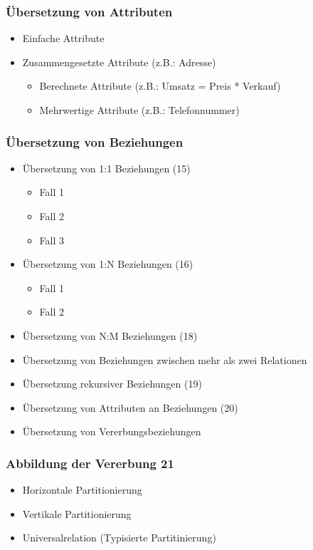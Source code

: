 \subsubsection{Übersetzung von Attributen}
\begin{itemize}
	\item Einfache Attribute
	\item Zusammengesetzte Attribute (z.B.: Adresse)
	\begin{itemize}
		\item Berechnete Attribute (z.B.: Umsatz = Preis * Verkauf)
		\item Mehrwertige Attribute (z.B.: Telefonnummer)
	\end{itemize}
\end{itemize}
\subsubsection{Übersetzung von Beziehungen}
\begin{itemize}
	\item Übersetzung von 1:1 Beziehungen (15)
	\begin{itemize}
		\item Fall 1
		\item Fall 2
		\item Fall 3
	\end{itemize}
	\item Übersetzung von 1:N Beziehungen (16)
	\begin{itemize}
		\item Fall 1
		\item Fall 2
	\end{itemize}
	\item Übersetzung von N:M Beziehungen (18)
	\item Übersetzung von Beziehungen zwischen mehr als zwei Relationen
	\item Übersetzung rekursiver Beziehungen (19)
	\item Übersetzung von Attributen an Beziehungen (20)
	\item Übersetzung von Vererbungsbeziehungen
\end{itemize}
\subsubsection{Abbildung der Vererbung 21}
\begin{itemize}
	\item Horizontale Partitionierung
	\item Vertikale Partitionierung
	\item Universalrelation (Typisierte Partitinierung)
\end{itemize}

